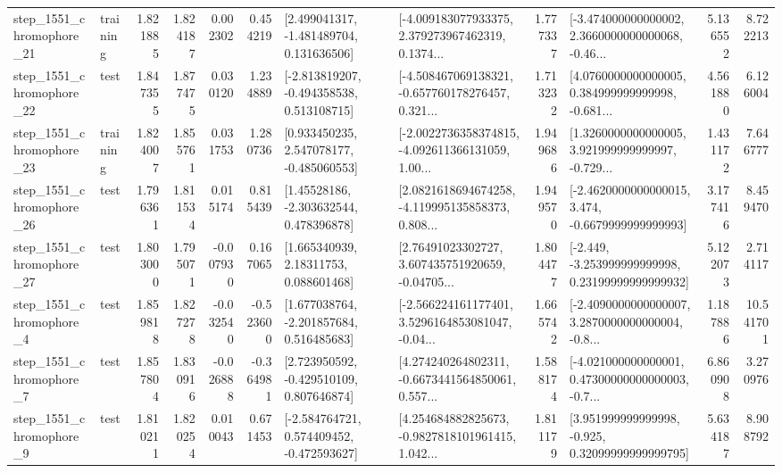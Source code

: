 \begin{tabular}{llrrrrllrlrr}
 step\_1551\_chromophore\_21 &  training &      1.821885 &    1.824187 &      0.002302 &  0.454219 &    [2.499041317, -1.481489704, 0.131636506] &  [-4.009183077933375, 2.379273967462319, 0.1374... &       1.777337 &  [-3.474000000000002, 2.3660000000000068, -0.46... &            5.136552 &          8.722213 \\
 step\_1551\_chromophore\_22 &      test &      1.847355 &    1.877475 &      0.030120 &  1.234889 &   [-2.813819207, -0.494358538, 0.513108715] &  [-4.508467069138321, -0.657760178276457, 0.321... &       1.713232 &  [4.0760000000000005, 0.384999999999998, -0.681... &            4.561880 &          6.126004 \\
 step\_1551\_chromophore\_23 &  training &      1.824007 &    1.855761 &      0.031753 &  1.280736 &    [0.933450235, 2.547078177, -0.485060553] &  [-2.0022736358374815, -4.092611366131059, 1.00... &       1.949686 &  [1.3260000000000005, 3.921999999999997, -0.729... &            1.431172 &          7.646777 \\
 step\_1551\_chromophore\_26 &      test &      1.796361 &    1.811534 &      0.015174 &  0.815439 &     [1.45528186, -2.303632544, 0.478396878] &  [2.0821618694674258, -4.119995135858373, 0.808... &       1.949570 &  [-2.4620000000000015, 3.474, -0.6679999999999993] &            3.177416 &          8.459470 \\
 step\_1551\_chromophore\_27 &      test &      1.803000 &    1.795071 &     -0.007930 &  0.167065 &      [1.665340939, 2.18311753, 0.088601468] &  [2.76491023302727, 3.607435751920659, -0.04705... &       1.804477 &  [-2.449, -3.253999999999998, 0.23199999999999932] &            5.122073 &          2.714117 \\
  step\_1551\_chromophore\_4 &      test &      1.859818 &    1.827278 &     -0.032540 & -0.523600 &    [1.677038764, -2.201857684, 0.516485683] &  [-2.566224161177401, 3.5296164853081047, -0.04... &       1.665742 &  [-2.4090000000000007, 3.2870000000000004, -0.8... &            1.187886 &         10.541701 \\
  step\_1551\_chromophore\_7 &      test &      1.857804 &    1.830916 &     -0.026888 & -0.364981 &    [2.723950592, -0.429510109, 0.807646874] &  [4.274240264802311, -0.6673441564850061, 0.557... &       1.588174 &  [-4.021000000000001, 0.47300000000000003, -0.7... &            6.860908 &          3.270976 \\
  step\_1551\_chromophore\_9 &      test &      1.810211 &    1.820254 &      0.010043 &  0.671453 &   [-2.584764721, 0.574409452, -0.472593627] &  [4.254684882825673, -0.9827818101961415, 1.042... &       1.811179 &   [3.951999999999998, -0.925, 0.32099999999999795] &            5.634187 &          8.908792 \\

\end{tabular}
